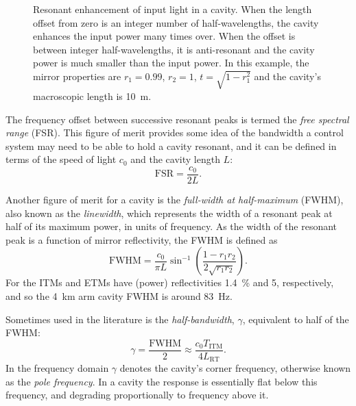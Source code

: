 \begin{figure}
  \centering
  
  \caption[Resonant enhancement of input light in a cavity]{\label{fig:cavity-fsr}Resonant enhancement of input light in a cavity. When the length offset from zero is an integer number of half-wavelengths, the cavity enhances the input power many times over. When the offset is between integer half-wavelengths, it is anti-resonant and the cavity power is much smaller than the input power. In this example, the mirror properties are $r_1 = 0.99$, $r_2 = 1$, $t = \sqrt{1 - r_1^2}$ and the cavity's macroscopic length is \SI{10}{\meter}.}
\end{figure}

The frequency offset between successive resonant peaks is termed the \emph{free spectral range} (\gls{FSR}). This figure of merit provides some idea of the bandwidth a control system may need to be able to hold a cavity resonant, and it can be defined in terms of the speed of light $c_0$ and the cavity length $L$:
\begin{equation}
  \label{eq:fsr}
  \text{FSR} = \frac{c_0}{2L}.
\end{equation}

Another figure of merit for a \FP{} cavity is the \emph{full-width at half-maximum} (\gls{FWHM}), also known as the \emph{linewidth}, which represents the width of a resonant peak at half of its maximum power, in units of frequency. As the width of the resonant peak is a function of mirror reflectivity, the \gls{FWHM} is defined as
\begin{equation}
  \text{FWHM} = \frac{c_0}{\pi L} \sin^{-1}{\left( \frac{1 - r_1 r_2}{2 \sqrt{r_1 r_2}} \right)}.
\end{equation}
For \ALIGO{} the \glspl{ITM} and \glspl{ETM} have (power) reflectivities \SI{1.4}{\percent} and \SI{5}{\ppm}, respectively, and so the \SI{4}{\kilo\meter} arm cavity \gls{FWHM} is around \SI{83}{\hertz}.

Sometimes used in the literature is the \emph{half-bandwidth}, $\gamma$, equivalent to half of the \gls{FWHM}:
\begin{equation}
  \gamma = \frac{\text{FWHM}}{2} \approx \frac{c_{0} T_{\textrm{ITM}}}{4 L_{\textrm{RT}}}.
\end{equation}
In the frequency domain $\gamma$ denotes the cavity's corner frequency, otherwise known as the \emph{pole frequency}. In a \FP{} cavity the response is essentially flat below this frequency, and degrading proportionally to frequency above it.

